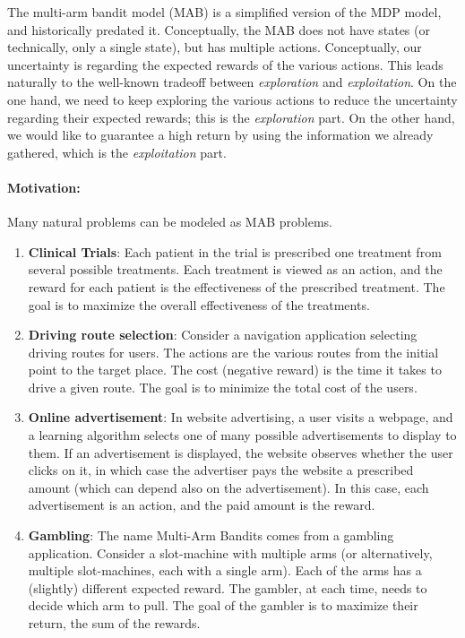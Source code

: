 
The multi-arm bandit model (MAB) is a simplified version of the MDP model, and historically predated it. Conceptually, the MAB does not have states (or technically, only a single state), but has multiple actions. Conceptually, our uncertainty is regarding the expected rewards of the various actions. This leads naturally to the well-known tradeoff between \emph{exploration} and \emph{exploitation}. On the one hand, we need to keep exploring the various actions to reduce the uncertainty regarding their expected rewards; this is the \emph{exploration} part. On the other hand, we would like to guarantee a high return by using the information we already gathered, which is the \emph{exploitation} part.

\paragraph{Motivation:} Many natural problems can be modeled as MAB problems.
\begin{enumerate}
\item \textbf{Clinical Trials}: Each patient in the trial is prescribed one treatment from several possible treatments. Each treatment is viewed as an action, and the reward for each patient is the effectiveness of the prescribed treatment. The goal is to maximize the overall effectiveness of the treatments.
\item \textbf{Driving route selection}: Consider a navigation application selecting driving routes for users. The actions are the various routes from the initial point to the target place. The cost (negative reward) is the time it takes to drive a given route. The goal is to minimize the total cost of the users.
\item \textbf{Online advertisement}: In website advertising, a user visits a webpage, and a learning algorithm selects one of many possible advertisements to display to them. If an advertisement is displayed, the website observes whether the user clicks on it, in which case the advertiser pays the website a prescribed amount (which can depend also on the advertisement). In this case, each advertisement is an action, and the paid amount is the reward.
\item \textbf{Gambling}: The name Multi-Arm Bandits comes from a gambling application. Consider a slot-machine with multiple arms (or alternatively, multiple slot-machines, each with a single arm). Each of the arms has a (slightly) different expected reward. The gambler, at each time, needs to decide which arm to pull. The goal of the gambler is to maximize their return, the sum of the rewards.
\end{enumerate}

